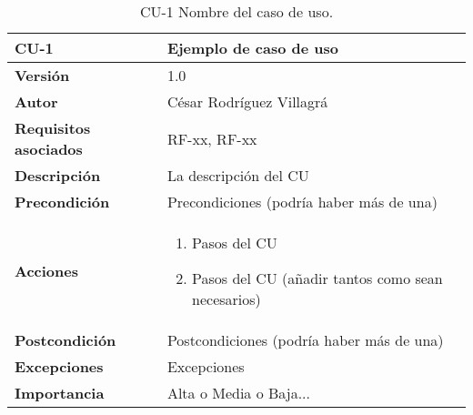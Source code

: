 \begin{table}[p]
	\centering
	\begin{tabularx}{\linewidth}{ p{} p{} }
		\toprule
		\textbf{CU-1}    & \textbf{Ejemplo de caso de uso}\\
		\toprule
		\textbf{Versión}              & 1.0    \\
		\textbf{Autor}                & César Rodríguez Villagrá \\
		\textbf{Requisitos asociados} & RF-xx, RF-xx \\
		\textbf{Descripción}          & La descripción del CU \\
		\textbf{Precondición}         & Precondiciones (podría haber más de una) \\
		\textbf{Acciones}             &
		\begin{enumerate}
			\def\labelenumi{\arabic{enumi}.}
			\tightlist
			\item Pasos del CU
			\item Pasos del CU (añadir tantos como sean necesarios)
		\end{enumerate}\\
		\textbf{Postcondición}        & Postcondiciones (podría haber más de una) \\
		\textbf{Excepciones}          & Excepciones \\
		\textbf{Importancia}          & Alta o Media o Baja... \\
		\bottomrule
	\end{tabularx}
	\caption{CU-1 Nombre del caso de uso.}
\end{table}
